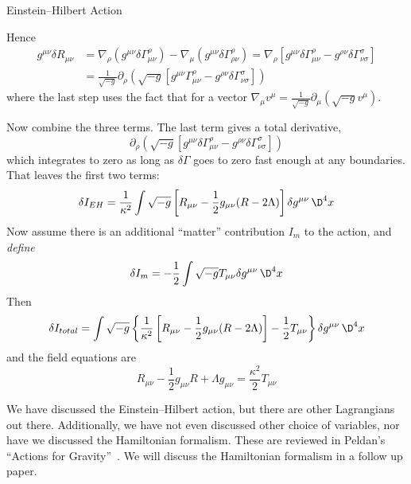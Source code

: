 \begin{Boxed}{Einstein--Hilbert Action}
\begin{enumerate}
Hence
\begin{equation}
\begin{split}
g^{\mu\nu}\delta R_{\mu\nu} 
&=\nabla_{\rho}(g^{\mu\nu}\delta\Gamma^{\rho}_{\mu\nu})-\nabla_{\mu}(g^{\mu\nu}\delta\Gamma^{\rho}_{\rho\nu})
=\nabla_{\rho}[g^{\mu\nu}\delta\Gamma^{\rho}_{\mu\nu}-g^{\rho\nu}\delta\Gamma^{\sigma}_{\nu\sigma}]\\ &=\frac{1}{\sqrt{-g}}\partial_{\rho}\left(\sqrt{-g}\left[g^{\mu\nu}\Gamma^{\rho}_{\mu\nu}-g^{\rho\nu}\delta\Gamma^{\sigma}_{\nu\sigma}\right]\right)
\end{split}
\end{equation}
where the last step uses the fact that for a vector $\nabla_{\mu}v^{\mu}=\frac{1}{\sqrt{-g}}\partial_{\mu}(\sqrt{-g}v^{\mu})$.
\end{enumerate}

Now combine the three terms. The last term gives a total
derivative,
\begin{equation}
\partial_{\rho}\left(\sqrt{-g}\left[g^{\mu\nu}\delta\Gamma^{\rho}_{\mu\nu}-g^{\rho\nu}\delta\Gamma^{\sigma}_{\nu\sigma}\right]\right)
\end{equation}
which integrates to zero as long as $\delta\Gamma$ goes to zero
fast enough at any boundaries. That leaves the first two terms:
\begin{equation}
\delta I_{EH} = \frac{1}{\kappa^{2}}\int\sqrt{-g}
\left[R_{\mu\nu}-\frac{1}{2}g_{\mu\nu}(R-2\Lambda)\right]\delta g^{\mu\nu}\,\D^{4}x
\end{equation}
Now assume there is an additional ``matter'' contribution $I_{m}$
to the action, and \emph{define}
\begin{equation}
\delta I_{m} = -\frac{1}{2}\int\sqrt{-g}T_{\mu\nu}\delta g^{\mu\nu}\,\D^{4}x
\end{equation}
Then
\begin{equation}
\delta I_{total} = \int \sqrt{-g}\left\{\frac{1}{\kappa^{2}}\left[R_{\mu\nu}-\frac{1}{2}g_{\mu\nu}(R-2\Lambda)\right]-\frac{1}{2}T_{\mu\nu}\right\}\delta g^{\mu\nu}
\,\D^{4}x
\end{equation}
and the field equations are 
\begin{equation}
R_{\mu\nu}-\frac{1}{2}g_{\mu\nu}R+\Lambda
g_{\mu\nu}=\frac{\kappa^{2}}{2}T_{\mu\nu}
\end{equation}
\end{Boxed}
\begin{rmk}
We have discussed the Einstein--Hilbert action, but there are
other Lagrangians out there. Additionally, we have not even
discussed other choice of variables, nor have we discussed the
Hamiltonian formalism. These are reviewed in Peldan's
``Actions for Gravity''~\cite{Peldan:1993hi}. We will discuss the
Hamiltonian formalism in a follow up paper.
\end{rmk}
